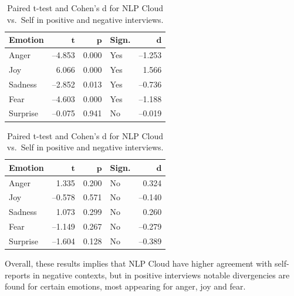   \begin{table}[H]
    \centering
  
    \begin{subtable}{0.45\textwidth}
      \centering
      \caption{Positive Recordings}\label{tab:rq3_t_nlp_self_pos}
      \begin{tabular}{l r r l r}
        \toprule
        \textbf{Emotion} & \(\mathbf{t}\) & \(\mathbf{p}\) & \textbf{Sign.} & \(\mathbf{d}\) \\
        \midrule
        Anger    & –4.853 & 0.000 & Yes & –1.253 \\
        Joy      &  6.066 & 0.000 & Yes &  1.566 \\
        Sadness  & –2.852 & 0.013 & Yes & –0.736 \\
        Fear     & –4.603 & 0.000 & Yes & –1.188 \\
        Surprise & –0.075 & 0.941 & No  & –0.019 \\
        \bottomrule
      \end{tabular}
    \end{subtable}\hfill
    \begin{subtable}{0.45\textwidth}
      \centering
      \caption{Negative Recordings}\label{tab:rq3_t_nlp_self_neg}
      \begin{tabular}{l r r l r}
        \toprule
        \textbf{Emotion} & \(\mathbf{t}\) & \(\mathbf{p}\) & \textbf{Sign.} & \(\mathbf{d}\) \\
        \midrule
        Anger    &  1.335 & 0.200 & No  &  0.324 \\
        Joy      & –0.578 & 0.571 & No  & –0.140 \\
        Sadness  &  1.073 & 0.299 & No  &  0.260 \\
        Fear     & –1.149 & 0.267 & No  & –0.279 \\
        Surprise & –1.604 & 0.128 & No  & –0.389 \\
        \bottomrule
      \end{tabular}
    \end{subtable}
  
    \caption{Paired t-test and Cohen’s d for NLP Cloud vs.\ Self in positive and negative interviews.}
    \label{tab:rq3_t_nlp_self_side_by_side}
  \end{table}

Overall, these results implies that NLP Cloud have higher agreement with self-reports in negative contexts, but in positive interviews notable divergencies are found for certain emotions, most appearing for anger, joy and fear.


